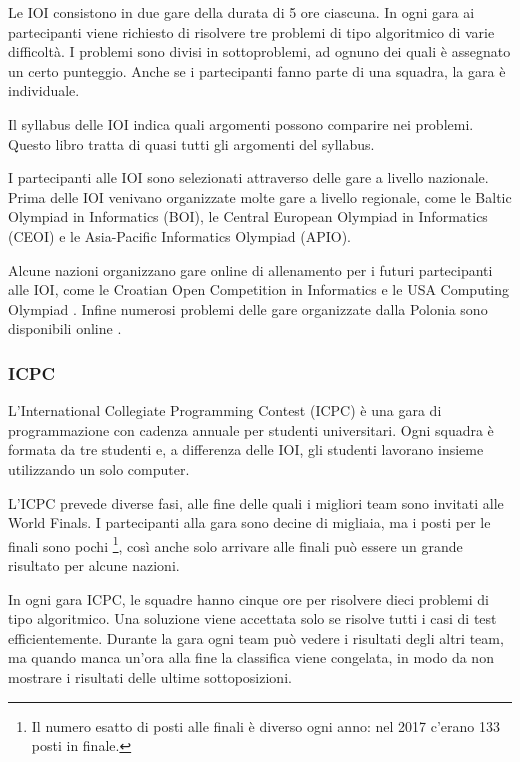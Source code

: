 Le IOI consistono in due gare della durata di 5 ore ciascuna.
In ogni gara ai partecipanti viene richiesto di risolvere tre 
problemi di tipo algoritmico di varie difficoltà.
I problemi sono divisi in sottoproblemi,
ad ognuno dei quali è assegnato un certo punteggio.
Anche se i partecipanti fanno parte di una squadra,
la gara è individuale.

Il syllabus delle IOI \cite{iois} indica quali
argomenti possono comparire nei problemi.
Questo libro tratta di quasi tutti gli argomenti del syllabus.

I partecipanti alle IOI sono selezionati attraverso
delle gare a livello nazionale.
Prima delle IOI venivano organizzate molte gare
a livello regionale, come le Baltic Olympiad in Informatics (BOI),
le Central European Olympiad in Informatics (CEOI) e le
Asia-Pacific Informatics Olympiad (APIO).

Alcune nazioni organizzano gare online di allenamento 
per i futuri partecipanti alle IOI,
come le Croatian Open Competition in Informatics \cite{coci}
e le USA Computing Olympiad \cite{usaco}.
Infine numerosi problemi delle gare organizzate dalla Polonia
sono disponibili online \cite{main}.

\subsubsection{ICPC}

L'International Collegiate Programming Contest (ICPC)
è una gara di programmazione con cadenza annuale per studenti universitari.
Ogni squadra è formata da tre studenti e, a differenza delle IOI,
gli studenti lavorano insieme utilizzando un solo computer.

L'ICPC prevede diverse fasi, alle fine delle quali 
i migliori team sono invitati alle World Finals.
I partecipanti alla gara sono decine di migliaia, 
ma i posti per le finali sono pochi \footnote{Il numero esatto di posti alle finali è diverso ogni anno: nel 2017 
c'erano 133 posti in finale.},
così anche solo arrivare alle finali può essere un
grande risultato per alcune nazioni. 

In ogni gara ICPC, le squadre hanno cinque ore per risolvere 
dieci problemi di tipo algoritmico.
Una soluzione viene accettata solo se risolve tutti i casi di test
efficientemente.
Durante la gara ogni team può vedere i risultati degli altri team,
ma quando manca un'ora alla fine la classifica viene congelata, 
in modo da non mostrare i risultati delle ultime sottoposizioni. 

